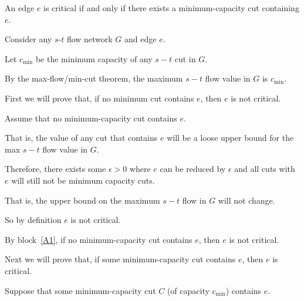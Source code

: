 \documentclass[10pt]{article}
\begin{document}



\begin{lemma}
  An edge $e$ is critical if and only if there exists a minimum-capacity cut containing $e$.
\end{lemma}

\begin{longFormProof}

  \begin{block}[A]
    {Consider any $s$-$t$ flow network $G$ and edge $e$.}

    \step Let $c_{\min}$ be the minimum capacity of any $s-t$ cut in $G$.

    \step By the max-flow/min-cut theorem, the maximum $s-t$ flow value in $G$ is $c_{\min}$. 

    \smallskip

    \lineacross
    
    \step First we will prove that, if no minimum cut contains $e$, then $e$ is not critical. 

    \begin{block}[A1]
      {Assume that no minimum-capacity cut contains $e$.}

      \step That is, the value of any cut that contains $e$ will be a loose upper bound for the max $s-t$ flow value in $G$.

      \step Therefore, there exists some $\epsilon > 0$ where $e$ can be reduced by $\epsilon$ 
              and all cuts with $e$ will still not be minimum capacity cuts. 

      \step That is, the upper bound on the maximum $s-t$ flow in $G$ will not change.

      \step So by definition $e$ is not critical.
    \end{block}
    
    \step[A2] By block~\ref{A1}, if no minimum-capacity cut contains $e$, then $e$ is not critical.

    \smallskip 
    
    \lineacross 

    \step Next we will prove that, if some minimum-capacity cut contains $e$, then $e$ is critical. 

    \begin{block}[A3]
      {Suppose that some minimum-capacity cut $C$ (of capacity $c_{\min}$) contains $e$.}


\end{block}
\end{block}
\end{longFormProof}
\end{document}
